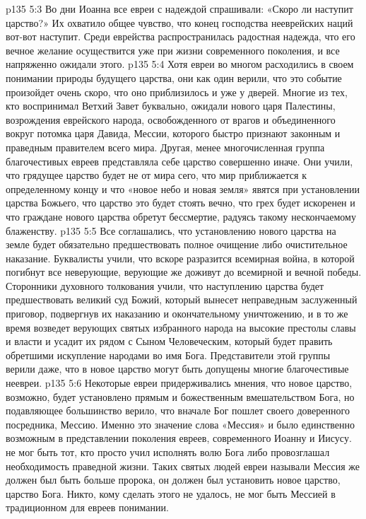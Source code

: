 \vs p135 5:3 Во дни Иоанна все евреи с надеждой спрашивали: «Скоро ли наступит царство?» Их охватило общее чувство, что конец господства нееврейских наций вот\hyp{}вот наступит. Среди еврейства распространилась радостная надежда, что его вечное желание осуществится уже при жизни современного поколения, и все напряженно ожидали этого.
\vs p135 5:4 Хотя евреи во многом расходились в своем понимании природы будущего царства, они как один верили, что это событие произойдет очень скоро, что оно приблизилось и уже у дверей. Многие из тех, кто воспринимал Ветхий Завет буквально, ожидали нового царя Палестины, возрождения еврейского народа, освобожденного от врагов и объединенного вокруг потомка царя Давида, Мессии, которого быстро признают законным и праведным правителем всего мира. Другая, менее многочисленная группа благочестивых евреев представляла себе царство совершенно иначе. Они учили, что грядущее царство будет не от мира сего, что мир приближается к определенному концу и что «новое небо и новая земля» явятся при установлении царства Божьего, что царство это будет стоять вечно, что грех будет искоренен и что граждане нового царства обретут бессмертие, радуясь такому нескончаемому блаженству.
\vs p135 5:5 Все соглашались, что установлению нового царства на земле будет обязательно предшествовать полное очищение либо очистительное наказание. Буквалисты учили, что вскоре разразится всемирная война, в которой погибнут все неверующие, верующие же доживут до всемирной и вечной победы. Сторонники духовного толкования учили, что наступлению царства будет предшествовать великий суд Божий, который вынесет неправедным заслуженный приговор, подвергнув их наказанию и окончательному уничтожению, и в то же время возведет верующих святых избранного народа на высокие престолы славы и власти и усадит их рядом с Сыном Человеческим, который будет править обретшими искупление народами во имя Бога. Представители этой группы верили даже, что в новое царство могут быть допущены многие благочестивые неевреи.
\vs p135 5:6 Некоторые евреи придерживались мнения, что новое царство, возможно, будет установлено прямым и божественным вмешательством Бога, но подавляющее большинство верило, что вначале Бог пошлет своего доверенного посредника, Мессию. Именно это значение слова «Мессия» и было единственно возможным в представлении поколения евреев, современного Иоанну и Иисусу.  не мог быть тот, кто просто учил исполнять волю Бога либо провозглашал необходимость праведной жизни. Таких святых людей евреи называли  Мессия же должен был быть больше пророка, он должен был установить новое царство, царство Бога. Никто, кому сделать этого не удалось, не мог быть Мессией в традиционном для евреев понимании.
